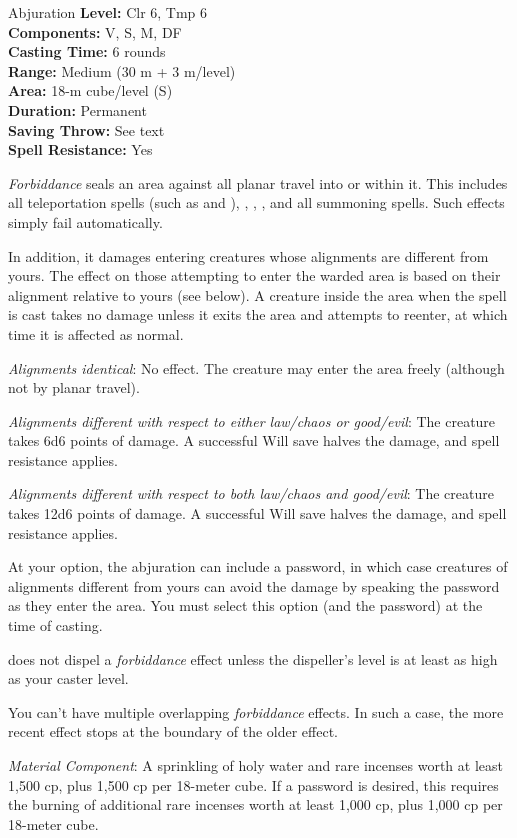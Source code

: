 {Abjuration}
{
	\textbf{Level:}
	Clr 6, Tmp 6\\
	\textbf{Components:}
	V, S, M, DF\\
	\textbf{Casting Time:}
	6 rounds\\
	\textbf{Range:}
	Medium (30 m + 3 m/level)\\
	\textbf{Area:}
	18-m cube/level (S)\\
	\textbf{Duration:}
	Permanent\\
	\textbf{Saving Throw:}
	See text\\
	\textbf{Spell Resistance:}
	Yes\\
}
{
	\emph{Forbiddance} seals an area against all planar travel into or within it. This includes all teleportation spells (such as  and ), , , , and all summoning spells. Such effects simply fail automatically.

	In addition, it damages entering creatures whose alignments are different from yours. The effect on those attempting to enter the warded area is based on their alignment relative to yours (see below). A creature inside the area when the spell is cast takes no damage unless it exits the area and attempts to reenter, at which time it is affected as normal.

	\textit{Alignments identical}:
	No effect. The creature may enter the area freely (although not by planar travel).

	\textit{Alignments different with respect to either law/chaos or good/evil}:
	The creature takes 6d6 points of damage. A successful Will save halves the damage, and spell resistance applies.

	\textit{Alignments different with respect to both law/chaos and good/evil}:
	The creature takes 12d6 points of damage. A successful Will save halves the damage, and spell resistance applies.

	At your option, the abjuration can include a password, in which case creatures of alignments different from yours can avoid the damage by speaking the password as they enter the area. You must select this option (and the password) at the time of casting.

	 does not dispel a \emph{forbiddance} effect unless the dispeller's level is at least as high as your caster level.

	You can't have multiple overlapping \emph{forbiddance} effects. In such a case, the more recent effect stops at the boundary of the older effect.

	\textit{Material Component}:
	A sprinkling of holy water and rare incenses worth at least 1,500 cp, plus 1,500 cp per 18-meter cube. If a password is desired, this requires the burning of additional rare incenses worth at least 1,000 cp, plus 1,000 cp per 18-meter cube.

}
